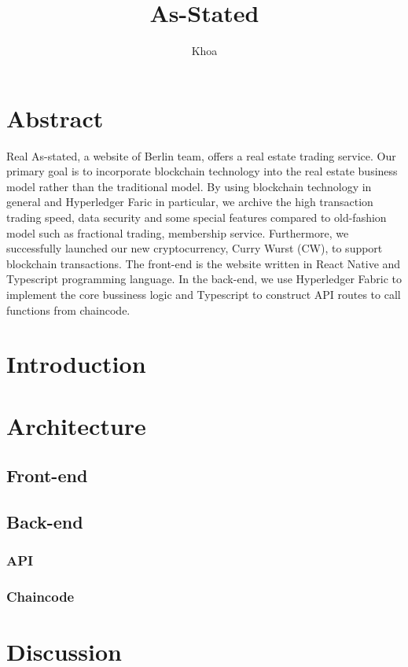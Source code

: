 \documentclass[11pt]{article}
\title{\LARGE As-Stated}
\author{Khoa}
\begin{document}
    \maketitle
    \begin{multicols}{2}
        \section{Abstract} 
            Real As-stated, a website of Berlin team, offers a real estate trading service.
            Our primary goal is to incorporate blockchain technology into the real estate business model rather than the traditional model.
            By using blockchain technology in general and Hyperledger Faric in particular, we archive the high transaction trading speed, data security and some special features compared to old-fashion model such as fractional trading, membership service.
            Furthermore, we successfully launched our new cryptocurrency, Curry Wurst (CW), to support blockchain transactions.
            The front-end is the website written in React Native and Typescript programming language.
            In the back-end, we use Hyperledger Fabric to implement the core bussiness logic and Typescript to construct API routes to call functions from chaincode.
        \section{Introduction}
        \section{Architecture}
            \subsection{Front-end}
            \subsection{Back-end}
                \subsubsection{API}
                \subsubsection{Chaincode}
        \section{Discussion}
    \end{multicols}
\end{document}
